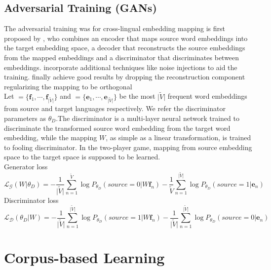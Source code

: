 \subsection{Adversarial Training (GANs)}
The adversarial training was for cross-lingual embedding mapping is first proposed by \cite{barone2016towards}, who combines an encoder that maps source word embeddings into the target embedding space, a decoder that reconstructs the source embeddings from the mapped embeddings and a discriminator that discriminates between embeddings. \cite{zhang2017adversarial} incorporate additional techniques like noise injections to aid the training. \cite{conneau2017word} finally achieve good results by dropping the reconstruction component regularizing the mapping to be orthogonal\\
Let ${=\{ \bm{f}_1, \cdots, \bm{f}_{{\lvert \tilde{V} \rvert}}\}}$ and ${ = \{ \bm{e}_1, \cdots , \bm{e}_{{\lvert \tilde{V} \rvert}}\}}$ be the most ${\lvert \tilde{V} \rvert}$ frequent word embeddings from source and target languages respectively. We refer the discriminator parameters as ${\theta_D}$.The discriminator is a multi-layer neural network trained to discriminate the transformed source word embedding from the target word embedding, while the mapping $W$, as simple as a linear transformation, is trained to fooling discriminator. In the two-player game, mapping from source embedding space to the target space is supposed to be learned.\\

Generator loss 
\[ \mathcal{L_G}(W|\theta_D) =  -\frac{1}{{\lvert \tilde{V} \rvert}} \sum_{n=1}^{\tilde{V}}\log P_{\theta_D}(source=0|W \bm{f}_n) - \frac{1}{\tilde{V}} \sum_{n=1}^{{\lvert \tilde{V} \rvert}} \log P_{\theta_D}(source = 1 | \bm{e}_n) \]
Discriminator loss
\[ \mathcal{L_D}(\theta_D | W) =  -\frac{1}{{\lvert \tilde{V} \rvert}} \sum_{n=1}^{{\lvert \tilde{V} \rvert}} \log P_{\theta_D}(source = 1| W\bm{f}_n) - \frac{1}{{\lvert \tilde{V} \rvert}} \sum_{n=1}^{{\lvert \tilde{V} \rvert}} \log P_{\theta_D}(source=0| \bm{e}_n) \]	 
\section{Corpus-based Learning}
